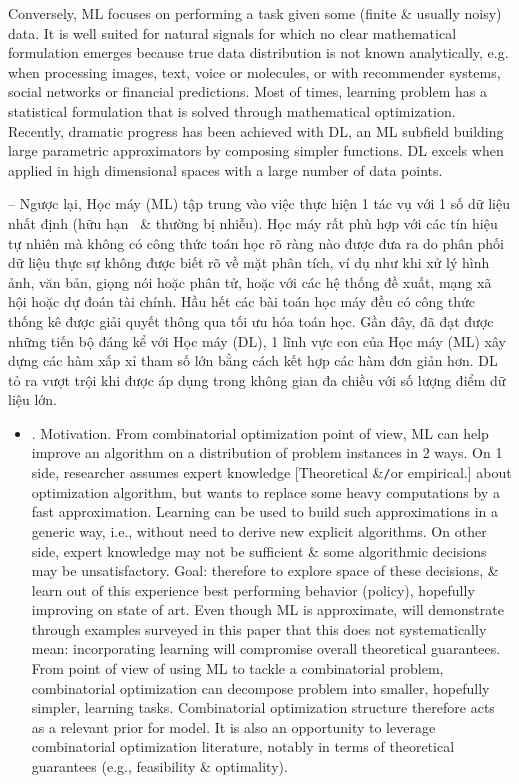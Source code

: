 \documentclass{article}
\begin{document}
\begin{itemize}
    Conversely, ML focuses on performing a task given some (finite \& usually noisy) data. It is well suited for natural signals for which no clear mathematical formulation emerges because true data distribution is not known analytically, e.g. when processing images, text, voice or molecules, or with recommender systems, social networks or financial predictions. Most of times, learning problem has a statistical formulation that is solved through mathematical optimization. Recently, dramatic progress has been achieved with DL, an ML subfield building large parametric approximators by composing simpler functions. DL excels when applied in high dimensional spaces with a large number of data points.

    -- Ngược lại, Học máy (ML) tập trung vào việc thực hiện 1 tác vụ với 1 số dữ liệu nhất định (hữu hạn \ \& thường bị nhiễu). Học máy rất phù hợp với các tín hiệu tự nhiên mà không có công thức toán học rõ ràng nào được đưa ra do phân phối dữ liệu thực sự không được biết rõ về mặt phân tích, ví dụ như khi xử lý hình ảnh, văn bản, giọng nói hoặc phân tử, hoặc với các hệ thống đề xuất, mạng xã hội hoặc dự đoán tài chính. Hầu hết các bài toán học máy đều có công thức thống kê được giải quyết thông qua tối ưu hóa toán học. Gần đây, đã đạt được những tiến bộ đáng kể với Học máy (DL), 1 lĩnh vực con của Học máy (ML) xây dựng các hàm xấp xỉ tham số lớn bằng cách kết hợp các hàm đơn giản hơn. DL tỏ ra vượt trội khi được áp dụng trong không gian đa chiều với số lượng điểm dữ liệu lớn.
    \begin{itemize}
        \item {. Motivation.} From combinatorial optimization point of view, ML can help improve an algorithm on a distribution of problem instances in 2 ways. On 1 side, researcher assumes expert knowledge [Theoretical \&{\tt/}or empirical.] about optimization algorithm, but wants to replace some heavy computations by a fast approximation. Learning can be used to build such approximations in a generic way, i.e., without need to derive new explicit algorithms. On other side, expert knowledge may not be sufficient \& some algorithmic decisions may be unsatisfactory. Goal: therefore to explore space of these decisions, \& learn out of this experience best performing behavior (policy), hopefully improving on state of art. Even though ML is approximate, will demonstrate through examples surveyed in this paper that this does not systematically mean: incorporating learning will compromise overall theoretical guarantees. From point of view of using ML to tackle a combinatorial problem, combinatorial optimization can decompose problem into smaller, hopefully simpler, learning tasks. Combinatorial optimization structure therefore acts as a relevant prior for model. It is also an opportunity to leverage combinatorial optimization literature, notably in terms of theoretical guarantees (e.g., feasibility \& optimality).


\end{itemize}
\end{itemize}
\end{document}
